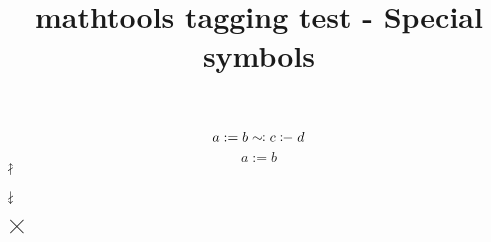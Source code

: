 \documentclass{article}
\title{mathtools tagging test - Special symbols}
\begin{document}
\[
  a := b \simcolon c \colondash d
\]
\[
  a := b
\]
$\nuparrow$

$\ndownarrow$

$\bigtimes$
\end{document}
